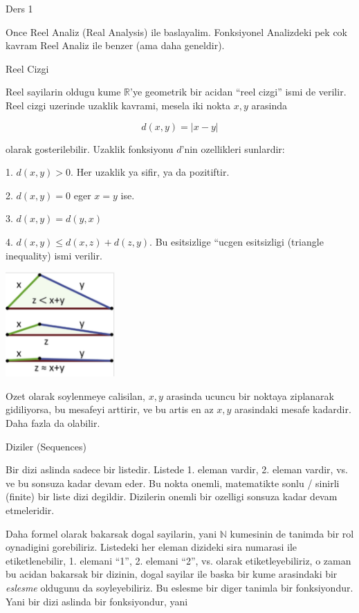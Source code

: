\documentclass[12pt,fleqn]{article}\usepackage{../common}
\begin{document}
Ders 1 

Once Reel Analiz (Real Analysis) ile baslayalim. Fonksiyonel Analizdeki pek
cok kavram Reel Analiz ile benzer (ama daha geneldir). 

Reel Cizgi 

Reel sayilarin oldugu kume $\mathbb{R}$'ye geometrik bir acidan ``reel
cizgi'' ismi de verilir. Reel cizgi uzerinde uzaklik kavrami, mesela iki
nokta $x,y$ arasinda

\[ d(x,y) = |x - y| \]

olarak gosterilebilir. Uzaklik fonksiyonu $d$'nin ozellikleri sunlardir:

1. $d(x,y) > 0$. Her uzaklik ya sifir, ya da pozitiftir. 

2. $d(x,y) = 0$ eger $x=y$ ise. 

3. $d(x,y) = d(y,x)$

4. $d(x,y) \le d(x,z) + d(z,y)$. Bu esitsizlige ``ucgen esitsizligi
(triangle inequality) ismi verilir. 

\includegraphics[height=4cm]{1_03.png}

Ozet olarak soylenmeye calisilan, $x,y$ arasinda ucuncu bir noktaya
ziplanarak gidiliyorsa, bu mesafeyi arttirir, ve bu artis en az $x,y$
arasindaki mesafe kadardir. Daha fazla da olabilir. 

Diziler (Sequences)

Bir dizi aslinda sadece bir listedir. Listede 1. eleman vardir, 2. eleman
vardir, vs. ve bu sonsuza kadar devam eder. Bu nokta onemli, matematikte
sonlu / sinirli (finite) bir liste dizi degildir. Dizilerin onemli bir
ozelligi sonsuza kadar devam etmeleridir. 

Daha formel olarak bakarsak dogal sayilarin, yani $\mathbb{N}$ kumesinin de
tanimda bir rol oynadigini gorebiliriz. Listedeki her eleman dizideki sira
numarasi ile etiketlenebilir, 1. elemani ``1'', 2. elemani ``2'',
vs. olarak etiketleyebiliriz, o zaman bu acidan bakarsak bir dizinin, dogal
sayilar ile baska bir kume arasindaki bir {\em eslesme} oldugunu da
soyleyebiliriz. Bu eslesme bir diger tanimla bir fonksiyondur. Yani bir
dizi aslinda bir fonksiyondur, yani 
\end{document}
